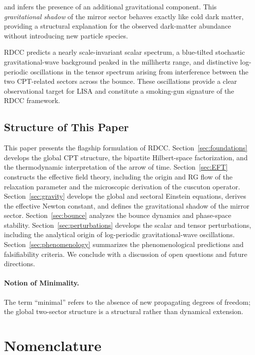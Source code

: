 \documentclass[11pt,a4paper]{article}
\begin{document}
and infers the presence of an additional gravitational component. This
\emph{gravitational shadow} of the mirror sector behaves exactly like cold dark
matter, providing a structural explanation for the observed dark-matter
abundance without introducing new particle species.

RDCC predicts a nearly scale-invariant scalar spectrum, a blue-tilted
stochastic gravitational-wave background peaked in the millihertz range, and
distinctive log-periodic oscillations in the tensor spectrum arising from
interference between the two CPT-related sectors across the bounce. These
oscillations provide a clear observational target for LISA and constitute a
smoking-gun signature of the RDCC framework.

\subsection*{Structure of This Paper}

This paper presents the flagship formulation of RDCC. Section~\ref{sec:foundations}
develops the global CPT structure, the bipartite Hilbert-space factorization,
and the thermodynamic interpretation of the arrow of time. Section~\ref{sec:EFT}
constructs the effective field theory, including the origin and RG flow of the
relaxation parameter and the microscopic derivation of the cuscuton operator.
Section~\ref{sec:gravity} develops the global and sectoral Einstein equations,
derives the effective Newton constant, and defines the gravitational shadow of
the mirror sector. Section~\ref{sec:bounce} analyzes the bounce dynamics and
phase-space stability. Section~\ref{sec:perturbations} develops the scalar and
tensor perturbations, including the analytical origin of log-periodic
gravitational-wave oscillations. Section~\ref{sec:phenomenology} summarizes the
phenomenological predictions and falsifiability criteria. We conclude with a
discussion of open questions and future directions.

\paragraph{Notion of Minimality.}
The term “minimal” refers to the absence of new propagating degrees of freedom;
the global two-sector structure is a structural rather than dynamical extension.

\clearpage

\section*{Nomenclature}
\end{document}
